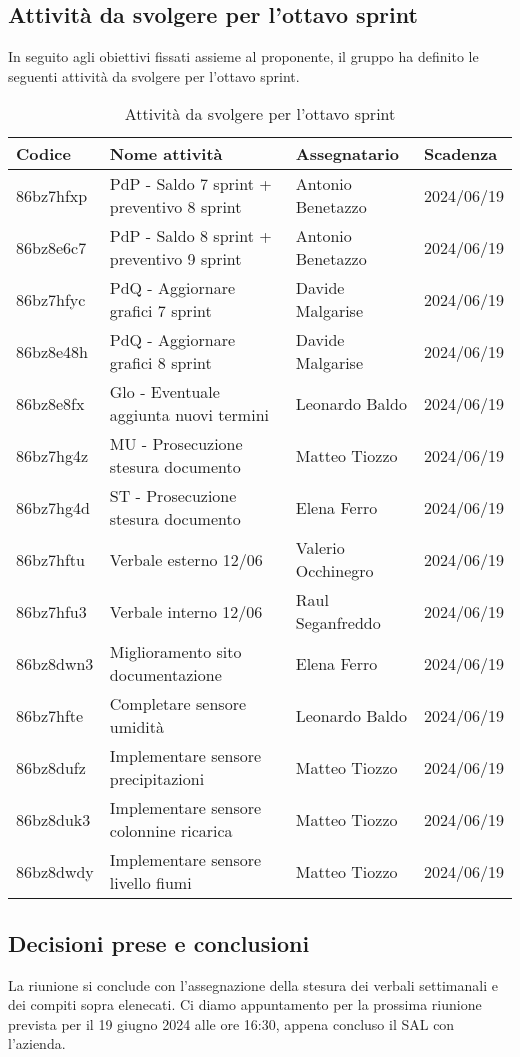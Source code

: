 \documentclass[italian,12pt]{article}
\begin{document}
\newpage

\subsection{Attività da svolgere per l'ottavo sprint}
In seguito agli obiettivi fissati assieme al proponente, il gruppo ha definito le seguenti attività da svolgere per l'ottavo sprint.

\begin{table}[!h]
	\centering
	\begin{tabular}{ |l||l|l|l| }
		\hline
		\textbf{Codice} & \textbf{Nome attività}                     & \textbf{Assegnatario} & \textbf{Scadenza} \\
		\hline
		86bz7hfxp       & PdP - Saldo 7 sprint + preventivo 8 sprint & Antonio Benetazzo     & 2024/06/19 \\
		86bz8e6c7       & PdP - Saldo 8 sprint + preventivo 9 sprint & Antonio Benetazzo     & 2024/06/19 \\
		86bz7hfyc       & PdQ - Aggiornare grafici 7 sprint          & Davide Malgarise      & 2024/06/19 \\
		86bz8e48h       & PdQ - Aggiornare grafici 8 sprint          & Davide Malgarise      & 2024/06/19 \\
		86bz8e8fx       & Glo - Eventuale aggiunta nuovi termini     & Leonardo Baldo        & 2024/06/19 \\
		86bz7hg4z       & MU - Prosecuzione stesura documento        & Matteo Tiozzo         & 2024/06/19 \\
		86bz7hg4d       & ST - Prosecuzione stesura documento        & Elena Ferro           & 2024/06/19 \\
		86bz7hftu       & Verbale esterno 12/06                      & Valerio Occhinegro    & 2024/06/19 \\
		86bz7hfu3       & Verbale interno 12/06                      & Raul Seganfreddo      & 2024/06/19 \\
		86bz8dwn3       & Miglioramento sito documentazione          & Elena Ferro           & 2024/06/19 \\
		86bz7hfte       & Completare sensore umidità                 & Leonardo Baldo        & 2024/06/19 \\
		86bz8dufz       & Implementare sensore precipitazioni        & Matteo Tiozzo         & 2024/06/19 \\
		86bz8duk3       & Implementare sensore colonnine ricarica    & Matteo Tiozzo         & 2024/06/19 \\
		86bz8dwdy       & Implementare sensore livello fiumi         & Matteo Tiozzo         & 2024/06/19 \\
		\hline
	\end{tabular}
	\caption{Attività da svolgere per l'ottavo sprint}
\end{table}

\subsection{Decisioni prese e conclusioni}
La riunione si conclude con l'assegnazione della stesura dei verbali settimanali e dei compiti sopra elenecati. Ci diamo appuntamento per la prossima riunione prevista per il 19 giugno 2024 alle ore 16:30, appena concluso il SAL con l'azienda.
\end{document}
